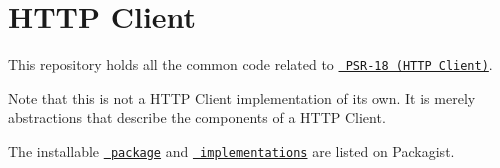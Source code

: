 \chapter{HTTP Client}
\hypertarget{md_vendor_2psr_2http-client_2_r_e_a_d_m_e}{}\label{md_vendor_2psr_2http-client_2_r_e_a_d_m_e}
This repository holds all the common code related to \href{https://www.php-fig.org/psr/psr-18}{\texttt{ PSR-\/18 (HTTP Client)}}.

Note that this is not a HTTP Client implementation of its own. It is merely abstractions that describe the components of a HTTP Client.

The installable \href{https://packagist.org/packages/psr/http-client}{\texttt{ package}} and \href{https://packagist.org/providers/psr/http-client-implementation}{\texttt{ implementations}} are listed on Packagist. 